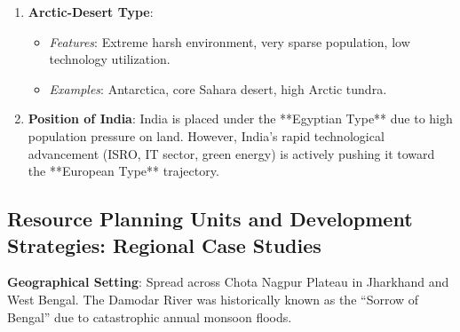 \documentclass[11pt,a4paper]{article}
\begin{document}
\begin{enumerate}[leftmargin=*]
  \item \textbf{Arctic-Desert Type}:
  \begin{itemize}
    \item \textit{Features}: Extreme harsh environment, very sparse population, low technology utilization.
    \item \textit{Examples}: Antarctica, core Sahara desert, high Arctic tundra.
  \end{itemize}

  \item \textbf{Position of India}: India is placed under the **Egyptian Type** due to high population pressure on land. However, India's rapid technological advancement (ISRO, IT sector, green energy) is actively pushing it toward the **European Type** trajectory.
\end{enumerate}

\newpage
\subsection{Resource Planning Units and Development Strategies: Regional Case Studies}

\begin{casebox}
\textbf{Geographical Setting}: Spread across Chota Nagpur Plateau in Jharkhand and West Bengal. The Damodar River was historically known as the ``Sorrow of Bengal'' due to catastrophic annual monsoon floods.
\end{casebox}
\end{document}
